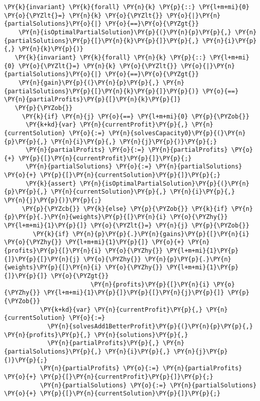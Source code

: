 \begin{sloppypar}
\begin{Verbatim}[commandchars=\\\{\}]
   \PY{k}{invariant} \PY{k}{forall} \PY{n}{k} \PY{p}{::} \PY{l+m+mi}{0} \PY{o}{\PYZlt{}=} \PY{n}{k} \PY{o}{\PYZlt{}} \PY{o}{|}\PY{n}{partialSolutions}\PY{o}{|} \PY{o}{==}\PY{o}{\PYZgt{}} 
    \PY{n}{isOptimalPartialSolution}\PY{p}{(}\PY{n}{p}\PY{p}{,} \PY{n}{partialSolutions}\PY{p}{[}\PY{n}{k}\PY{p}{]}\PY{p}{,} \PY{n}{i}\PY{p}{,} \PY{n}{k}\PY{p}{)}
   \PY{k}{invariant} \PY{k}{forall} \PY{n}{k} \PY{p}{::} \PY{l+m+mi}{0} \PY{o}{\PYZlt{}=} \PY{n}{k} \PY{o}{\PYZlt{}} \PY{o}{|}\PY{n}{partialSolutions}\PY{o}{|} \PY{o}{==}\PY{o}{\PYZgt{}} 
    \PY{n}{gain}\PY{p}{(}\PY{n}{p}\PY{p}{,} \PY{n}{partialSolutions}\PY{p}{[}\PY{n}{k}\PY{p}{]}\PY{p}{)} \PY{o}{==} \PY{n}{partialProfits}\PY{p}{[}\PY{n}{k}\PY{p}{]}
   \PY{p}{\PYZob{}}
     \PY{k}{if} \PY{n}{j} \PY{o}{==} \PY{l+m+mi}{0} \PY{p}{\PYZob{}}
      \PY{k+kd}{var} \PY{n}{currentProfit}\PY{p}{,} \PY{n}{currentSolution} \PY{o}{:=} \PY{n}{solvesCapacity0}\PY{p}{(}\PY{n}{p}\PY{p}{,} \PY{n}{i}\PY{p}{,} \PY{n}{j}\PY{p}{)}\PY{p}{;}
      \PY{n}{partialProfits} \PY{o}{:=} \PY{n}{partialProfits} \PY{o}{+} \PY{p}{[}\PY{n}{currentProfit}\PY{p}{]}\PY{p}{;}
      \PY{n}{partialSolutions} \PY{o}{:=} \PY{n}{partialSolutions} \PY{o}{+} \PY{p}{[}\PY{n}{currentSolution}\PY{p}{]}\PY{p}{;}
      \PY{k}{assert} \PY{n}{isOptimalPartialSolution}\PY{p}{(}\PY{n}{p}\PY{p}{,} \PY{n}{currentSolution}\PY{p}{,} \PY{n}{i}\PY{p}{,} \PY{n}{j}\PY{p}{)}\PY{p}{;}
     \PY{p}{\PYZcb{}} \PY{k}{else} \PY{p}{\PYZob{}} \PY{k}{if} \PY{n}{p}\PY{p}{.}\PY{n}{weights}\PY{p}{[}\PY{n}{i} \PY{o}{\PYZhy{}} \PY{l+m+mi}{1}\PY{p}{]} \PY{o}{\PYZlt{}=} \PY{n}{j} \PY{p}{\PYZob{}}
        \PY{k}{if} \PY{n}{p}\PY{p}{.}\PY{n}{gains}\PY{p}{[}\PY{n}{i} \PY{o}{\PYZhy{}} \PY{l+m+mi}{1}\PY{p}{]} \PY{o}{+} \PY{n}{profits}\PY{p}{[}\PY{n}{i} \PY{o}{\PYZhy{}} \PY{l+m+mi}{1}\PY{p}{]}\PY{p}{[}\PY{n}{j} \PY{o}{\PYZhy{}} \PY{n}{p}\PY{p}{.}\PY{n}{weights}\PY{p}{[}\PY{n}{i} \PY{o}{\PYZhy{}} \PY{l+m+mi}{1}\PY{p}{]}\PY{p}{]} \PY{o}{\PYZgt{}} 
                        \PY{n}{profits}\PY{p}{[}\PY{n}{i} \PY{o}{\PYZhy{}} \PY{l+m+mi}{1}\PY{p}{]}\PY{p}{[}\PY{n}{j}\PY{p}{]} \PY{p}{\PYZob{}}
          \PY{k+kd}{var} \PY{n}{currentProfit}\PY{p}{,} \PY{n}{currentSolution} \PY{o}{:=} 
            \PY{n}{solvesAdd1BetterProfit}\PY{p}{(}\PY{n}{p}\PY{p}{,} \PY{n}{profits}\PY{p}{,} \PY{n}{solutions}\PY{p}{,} 
            \PY{n}{partialProfits}\PY{p}{,} \PY{n}{partialSolutions}\PY{p}{,} \PY{n}{i}\PY{p}{,} \PY{n}{j}\PY{p}{)}\PY{p}{;}
          \PY{n}{partialProfits} \PY{o}{:=} \PY{n}{partialProfits} \PY{o}{+} \PY{p}{[}\PY{n}{currentProfit}\PY{p}{]}\PY{p}{;}
          \PY{n}{partialSolutions} \PY{o}{:=} \PY{n}{partialSolutions} \PY{o}{+} \PY{p}{[}\PY{n}{currentSolution}\PY{p}{]}\PY{p}{;}

\end{Verbatim}
\end{sloppypar}
